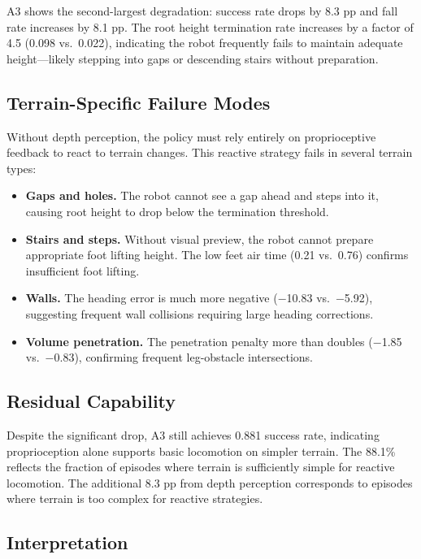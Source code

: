 A3 shows the second-largest degradation: success rate drops by 8.3 pp and fall rate increases by 8.1 pp. The root height termination rate increases by a factor of 4.5 (0.098 vs.\ 0.022), indicating the robot frequently fails to maintain adequate height---likely stepping into gaps or descending stairs without preparation.

\subsection{Terrain-Specific Failure Modes}

Without depth perception, the policy must rely entirely on proprioceptive feedback to react to terrain changes. This reactive strategy fails in several terrain types:

\begin{itemize}
    \item \textbf{Gaps and holes.} The robot cannot see a gap ahead and steps into it, causing root height to drop below the termination threshold.
    \item \textbf{Stairs and steps.} Without visual preview, the robot cannot prepare appropriate foot lifting height. The low feet air time (0.21 vs.\ 0.76) confirms insufficient foot lifting.
    \item \textbf{Walls.} The heading error is much more negative ($-$10.83 vs.\ $-$5.92), suggesting frequent wall collisions requiring large heading corrections.
    \item \textbf{Volume penetration.} The penetration penalty more than doubles ($-$1.85 vs.\ $-$0.83), confirming frequent leg-obstacle intersections.
\end{itemize}

\subsection{Residual Capability}

Despite the significant drop, A3 still achieves 0.881 success rate, indicating proprioception alone supports basic locomotion on simpler terrain. The 88.1\% reflects the fraction of episodes where terrain is sufficiently simple for reactive locomotion. The additional 8.3 pp from depth perception corresponds to episodes where terrain is too complex for reactive strategies.

\subsection{Interpretation}

